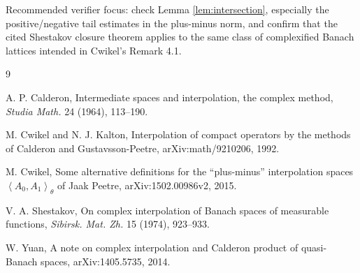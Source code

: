 \documentclass[11pt]{article}
\begin{document}
Recommended verifier focus: check Lemma \ref{lem:intersection},
especially the positive/negative tail estimates in the plus-minus norm,
and confirm that the cited Shestakov closure theorem applies to the
same class of complexified Banach lattices intended in Cwikel's Remark
4.1.

\begin{thebibliography}{9}

A. P. Calderon,
Intermediate spaces and interpolation, the complex method,
\emph{Studia Math.} 24 (1964), 113--190.

M. Cwikel and N. J. Kalton,
Interpolation of compact operators by the methods of Calderon and
Gustavsson-Peetre,
arXiv:math/9210206, 1992.

M. Cwikel,
Some alternative definitions for the ``plus-minus'' interpolation spaces
$\left\langle A_0,A_1\right\rangle_\theta$ of Jaak Peetre,
arXiv:1502.00986v2, 2015.

V. A. Shestakov,
On complex interpolation of Banach spaces of measurable functions,
\emph{Sibirsk. Mat. Zh.} 15 (1974), 923--933.

W. Yuan,
A note on complex interpolation and Calderon product of quasi-Banach
spaces,
arXiv:1405.5735, 2014.

\end{thebibliography}
\end{document}
